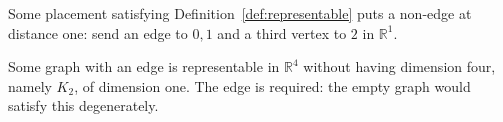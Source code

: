 \begin{theorem}
  \label{thm:sep-representable}
  \leanok
  Some placement satisfying Definition~\ref{def:representable} puts a non-edge at distance one:
  send an edge to $0, 1$ and a third vertex to $2$ in $\mathbb{R}^1$.
\end{theorem}

\begin{theorem}
  \label{thm:sep-dimension}
  \leanok
  Some graph with an edge is representable in $\mathbb{R}^4$ without having dimension four, namely
  $K_2$, of dimension one. The edge is required: the empty graph would satisfy this degenerately.
\end{theorem}
